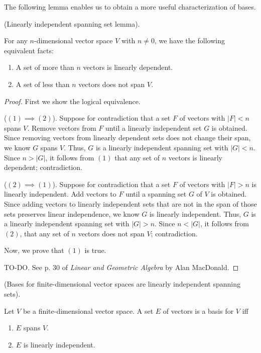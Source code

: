 The following lemma enables us to obtain a more useful characterization of bases.

\begin{lemma}
\label{ch::lin_alg::lemma::dimension}
    (Linearly independent spanning set lemma). 
    
    For any $n$-dimensional vector space $V$ with $n \neq 0$, we have the following equivalent facts:
    
    \begin{enumerate}
        \item A set of more than $n$ vectors is linearly dependent.
        \item A set of less than $n$ vectors does not span $V$.
    \end{enumerate}
\end{lemma}

\begin{proof}
    First we show the logical equivalence.
    
    ($(1) \implies (2)$). Suppose for contradiction that a set $F$ of vectors with $|F| < n$ spans $V$. Remove vectors from $F$ until a linearly independent set $G$ is obtained. Since removing vectors from linearly dependent sets does not change their span, we know $G$ spans $V$. Thus, $G$ is a linearly independent spanning set with $|G| < n$. Since $n > |G|$, it follows from $(1)$ that any set of $n$ vectors is linearly dependent; contradiction.
    
    ($(2) \implies (1)$). Suppose for contradiction that a set $F$ of vectors with $|F| > n$ is linearly independent. Add vectors to $F$ until a spanning set $G$ of $V$ is obtained. Since adding vectors to linearly independent sets that are not in the span of those sets preserves linear independence, we know $G$ is linearly independent. Thus, $G$ is a linearly independent spanning set with $|G| > n$. Since $n < |G|$, it follows from $(2)$, that any set of $n$ vectors does not span $V$; contradiction.

    Now, we prove that $(1)$ is true.
    
    TO-DO. See p. 30 of \textit{Linear and Geometric Algebra} by Alan MacDonald.
\end{proof}

\begin{theorem}
    (Bases for finite-dimensional vector spaces are linearly independent spanning sets).
    
    Let $V$ be a finite-dimensional vector space. A set $E$ of vectors is a basis for $V$ iff
    
    \begin{enumerate}
        \item $E$ spans $V$.
        \item $E$ is linearly independent.
    \end{enumerate}
\end{theorem}

